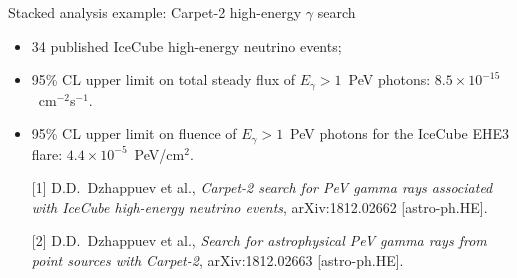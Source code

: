 \begin{frame}{Stacked analysis example: Carpet-2 high-energy $\gamma$ search}
    \begin{itemize}
        \item 34 published IceCube high-energy neutrino events;
        \item 95\% CL upper limit on total steady flux of $E_{\gamma} > 1$~PeV photons: $8.5 \times 10^{-15}$~cm$^{-2}$s$^{-1}$.
        \item 95\% CL upper limit on fluence of $E_{\gamma} > 1$~PeV photons for the IceCube EHE3 flare: $4.4 \times 10^{-5}$~PeV/cm$^2$.
    \end{itemize}
    \hrulefill
    \small
    \begin{itemize}
        \item[{[1]}] D.D.~Dzhappuev et al., \textit{Carpet-2 search for PeV gamma rays associated with IceCube high-energy neutrino events}, arXiv:1812.02662 [astro-ph.HE].
        \item[{[2]}] D.D.~Dzhappuev et al., \textit{Search for astrophysical PeV gamma rays from point sources with Carpet-2}, arXiv:1812.02663 [astro-ph.HE].
    \end{itemize}
\end{frame}
